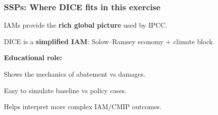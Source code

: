 \documentclass[xcolor=x11names,compress,aspectratio=169]{beamer}%
\makeatletter
\renewenvironment{itemize}{\begin{compactitemize}[<+-| alert@+>]}{\end{compactitemize}}
\makeatother
\begin{document}
\begin{frame}%
%

\frametitle{SSPs: Where DICE fits in this exercise}%


\begin{itemize}
\item IAMs provide the \textbf{rich global picture} used by IPCC.%
\vspace{1ex}%


\item DICE is a \textbf{simplified IAM}: Solow--Ramsey economy + climate
block.%
\vspace{3ex}%


\item \textbf{Educational role:}%
\vspace{1ex}%


\begin{itemize}
\item Shows the mechanics of abatement vs damages.%
\vspace{1ex}%


\item Easy to simulate baseline vs policy cases.%
\vspace{1ex}%


\item Helps interpret more complex IAM/CMIP outcomes.
\end{itemize}
\end{itemize}

%

\transboxout
\end{frame}%
\end{document}
